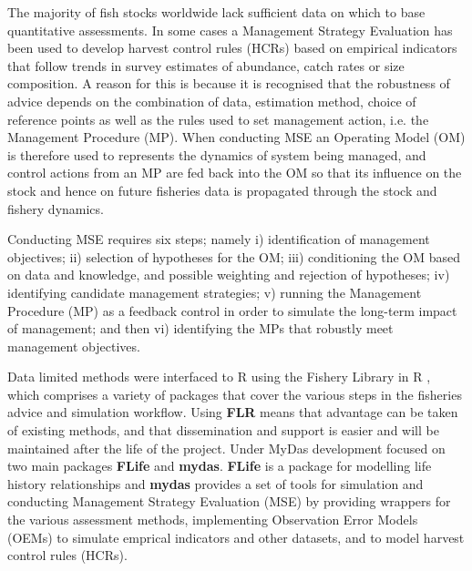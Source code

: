 The majority of fish stocks worldwide lack sufficient data on which to base quantitative assessments. In some cases a Management Strategy Evaluation \citep[MSE][]{10.1093/icesjms/fst232} has been used to develop harvest control rules (HCRs) based on empirical indicators that follow trends in survey estimates of abundance, catch rates or size composition. %
A reason for this is because it is recognised that the robustness of advice depends on the combination of data, estimation method, choice of reference points as well as the rules used to set management action, i.e. the Management Procedure (MP). When conducting MSE an Operating Model (OM) is therefore used to represents the dynamics of system being managed, and control actions from an MP are fed back into the OM so that its influence on the stock and hence on future fisheries data is propagated through the stock and fishery dynamics. 

Conducting MSE requires six steps; namely i) identification of management objectives; ii) selection of hypotheses for the OM; iii) conditioning the OM based on data and knowledge, and possible weighting and rejection of hypotheses; iv) identifying candidate management strategies; v) running the Management Procedure (MP) as a feedback control in order to simulate the long-term impact of management; and then vi) identifying the MPs that robustly meet management objectives. 

Data limited methods were interfaced to R using the Fishery Library in R \citep[\href{http://www.flr-project.org/}{FLR}][]{kell2007flr}, which comprises a variety of packages that cover the various steps in the fisheries advice and simulation workflow. Using \textbf{FLR} means that advantage can be taken of existing methods, and that dissemination and support is easier and will be maintained after the life of the project. Under MyDas development focused on two main packages \textbf{FLife} and \textbf{mydas}. \textbf{FLife} is a package for modelling life history relationships and \textbf{mydas} provides a set of tools for simulation and conducting Management Strategy Evaluation (MSE) by providing wrappers for the various assessment methods, implementing Observation Error Models (OEMs) to simulate emprical indicators and other datasets, and to model harvest control rules (HCRs).


